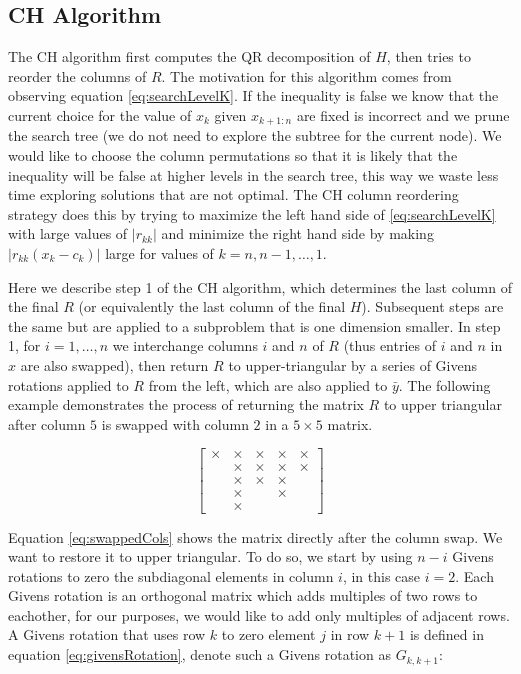 \documentclass[12pt,Bold,letterpaper]{mcgilletdclass}
\newcommand{\vsp}{\vspace{\baselineskip}}
\begin{document}
\vsp \subsection{CH Algorithm} \label{subsec:CH}
The CH algorithm first computes the QR decomposition of $H$,
then  tries to reorder the columns of $R$.
The motivation for this algorithm comes from observing equation \eqref{eq:searchLevelK}.
If the inequality is false we know that the current choice for the value of
$x_k$ given $x_{k+1:n}$ are fixed is incorrect and we prune the search tree (we do not need to explore the subtree for the current node). We
would like to choose the column permutations so that it is likely that the
inequality will be false at higher levels in the search tree, this way we waste less time exploring solutions that are not optimal. The CH column reordering strategy
does this by trying to maximize the left hand side of  \eqref{eq:searchLevelK} with large values of $\left | r_{kk}
\right |$ and minimize the right hand side by making $\left | r_{kk}(x_k-c_k) \right |$
large for values of $k = n,n-1, \dots, 1$.

Here we describe  step 1 of the CH algorithm, which determines the last column of the final $R$ 
(or equivalently the last column of the final $H$).
Subsequent steps are the same but are applied to a subproblem that is one dimension smaller. 
In step 1, for $i = 1,\dots,n$ we interchange
columns $i$ and $n$ of  $R$ (thus entries of $i$ and $n$ in $x$ are also swapped), then return $R$ to upper-triangular
by a series of Givens rotations applied to $R$ from the left, which  are also applied to $\bar{y}$. The following example demonstrates the process of returning the matrix $R$ to upper triangular after column $5$ is swapped with column $2$ in a $5 \times 5$ matrix.

\begin{equation} \label{eq:swappedCols}
\begin{bmatrix}
\times & \times & \times & \times & \times\\ 
  & \times & \times & \times & \times\\ 
  & \times & \times & \times &  \\ 
  & \times &  &  \times &  \\ 
  & \times &  &    & 
\end{bmatrix}
\end{equation}

Equation \ref{eq:swappedCols} shows the matrix directly after the column swap. We want to restore it to upper triangular. To do so, we start by using $n-i$ Givens rotations to zero the subdiagonal elements in column $i$, in this case $i = 2$. Each Givens rotation is an orthogonal matrix which adds multiples of two rows to eachother, for our purposes, we would like to add only multiples of adjacent rows. A Givens rotation that uses row $k$ to zero element $j$ in row $k+1$ is defined in equation \eqref{eq:givensRotation}, denote such a Givens rotation as $G_{k,k+1}$:
\end{document}
